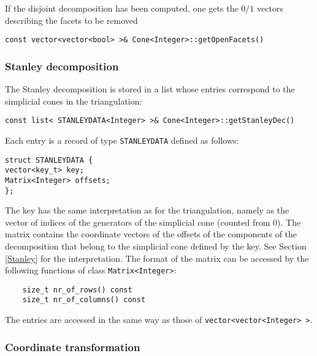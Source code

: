 \documentclass[12pt,a4paper]{scrartcl}
\theoremstyle{definition}
\begin{document}
\begin{small}
If the disjoint decomposition has been computed, one gets the $0/1$ vectors describing the facets to be removed 

\begin{Verbatim}
const vector<vector<bool> >& Cone<Integer>::getOpenFacets()
\end{Verbatim}

\subsubsection{Stanley decomposition}

The Stanley decomposition is stored in a list whose entries correspond to the simplicial cones in the triangulation:
\begin{Verbatim}
const list< STANLEYDATA<Integer> >& Cone<Integer>::getStanleyDec()
\end{Verbatim}
Each entry is a record of type \verb|STANLEYDATA| defined as follows:
\begin{Verbatim}
struct STANLEYDATA {
vector<key_t> key;
Matrix<Integer> offsets;
};
\end{Verbatim}
The key has the same interpretation as for the triangulation, namely as the vector of indices of the generators of the simplicial cone (counted from $0$). The matrix contains the coordinate vectors of the offsets of the components of the decomposition that belong to the simplicial cone defined by the key. See Section \ref{Stanley} for the interpretation. The format of the matrix can be accessed by the following functions of class \verb|Matrix<Integer>|:
\begin{Verbatim}
    size_t nr_of_rows() const
    size_t nr_of_columns() const    
\end{Verbatim}
The entries are accessed in the same way as those of \verb|vector<vector<Integer> >|.

\subsubsection{Coordinate transformation}\label{coord}


\end{small}
\end{document}
